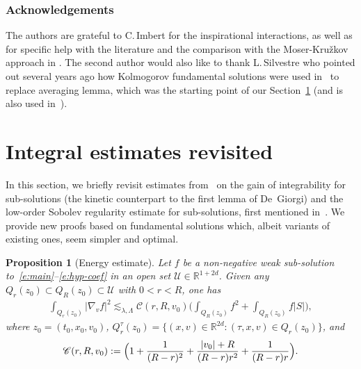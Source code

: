 \documentclass[JEP,XML,SOM,Unicode,NoFloatCountersInSection,published]{cedram}
\let\mathcal\mathscr
\newtheorem{proposition}[theorem]{Proposition}
\theoremstyle{definition}
\theoremstyle{remark}
\newcommand\R{{\mathbb R}}
\newcommand{\cC}{\mathcal C}
\newcommand{\cU}{\mathcal{U}}
\begin{document}
\subsubsection*{Acknowledgements} The authors are grateful to
C.\,Imbert for the inspirational interactions, as well as for
specific help with the literature and the comparison with the
Moser-Kru\v{z}kov approach in \cite{Guerand-Imbert}. The second
author would also like to thank L.\,Silvestre who pointed out
several years ago how Kolmogorov fundamental solutions were used
in~\cite{pp} to replace averaging lemma, which was the starting
point of our Section~\ref{sec:int} (and is also used
in~\cite{MR4049224}).


\section{Integral estimates revisited}
\label{sec:int}

In this section, we briefly revisit estimates from~\cite{pp,gimv}
on the gain of inte\-grability for sub-solutions (the kinetic
counterpart to the first lemma of De~Giorgi) and the low-order
Sobolev regularity estimate for sub-solutions, first mentioned
in~\cite{gimv}. We provide new proofs based on fundamental
solutions which, albeit variants of existing ones, seem simpler
and optimal.


\begin{proposition}[Energy estimate]
\label{prop:EE}
Let $f$ be a non-negative weak sub-solution
to~\eqref{e:main}--\eqref{e:hyp-coef} in an open set
$\cU \in \R^{1+2d}$. Given any
$Q_r(z_0) \subset Q_R(z_0) \subset \cU$ with $0<r<R$, one has
\begin{align*}
\int_{Q_r(z_0)} |\nabla_v f|^2
\lesssim_{\lambda,\Lambda} \cC(r,R,v_0) \biggl(
\int_{Q_R(z_0)} f^2 + \int_{Q_R(z_0)} f |S| \biggr),
\end{align*}
where $z_0=(t_0,x_0,v_0)$,
$Q_r^\tau (z_0) = \{(x,v)\in\R^{2d} :(\tau,x,v)\in
Q_r(z_0) \} $, and
\begin{equation}
\label{eq:C}
\cC(r,R,v_0) := \Bigl( 1 + \frac{1}{(R-r)^2} +
\frac{|v_0|+R}{(R-r)r^2} +\frac{1}{(R-r)r} \Bigr).
\end{equation}
\end{proposition}
\end{document}
